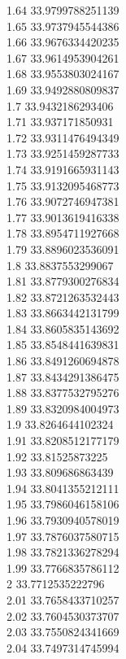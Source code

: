 {1.64	33.9799788251139\\
1.65	33.9737945544386\\
1.66	33.9676334420235\\
1.67	33.9614953904261\\
1.68	33.9553803024167\\
1.69	33.9492880809837\\
1.7	33.9432186293406\\
1.71	33.937171850931\\
1.72	33.9311476494349\\
1.73	33.9251459287733\\
1.74	33.9191665931143\\
1.75	33.9132095468773\\
1.76	33.9072746947381\\
1.77	33.9013619416338\\
1.78	33.8954711927668\\
1.79	33.8896023536091\\
1.8	33.8837553299067\\
1.81	33.8779300276834\\
1.82	33.8721263532443\\
1.83	33.8663442131799\\
1.84	33.8605835143692\\
1.85	33.8548441639831\\
1.86	33.8491260694878\\
1.87	33.8434291386475\\
1.88	33.8377532795276\\
1.89	33.8320984004973\\
1.9	33.8264644102324\\
1.91	33.8208512177179\\
1.92	33.81525873225\\
1.93	33.809686863439\\
1.94	33.8041355212111\\
1.95	33.7986046158106\\
1.96	33.7930940578019\\
1.97	33.7876037580715\\
1.98	33.7821336278294\\
1.99	33.7766835786112\\
2	33.7712535222796\\
2.01	33.7658433710257\\
2.02	33.7604530373707\\
2.03	33.7550824341669\\
2.04	33.7497314745994\\
}
